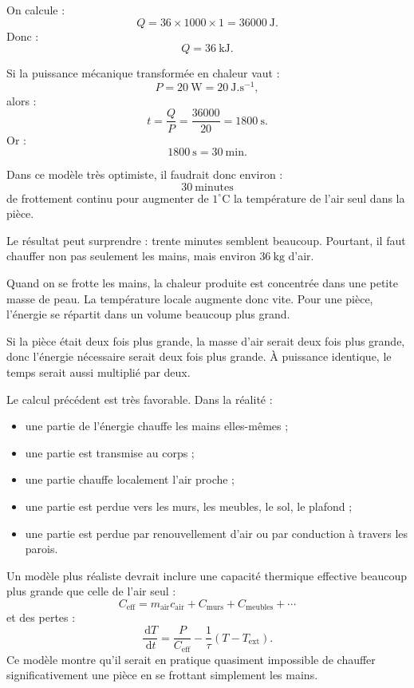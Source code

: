 \documentclass[11pt,a4paper]{article}
\newcommand{\dd}{\,\mathrm d}
\begin{document}
\begin{corrigebox}
On calcule :
\[
Q=36\times1000\times1=36000\ \mathrm J.
\]
Donc :
\[
Q=36\ \mathrm{kJ}.
\]

Si la puissance mécanique transformée en chaleur vaut :
\[
P=20\ \mathrm W=20\ \mathrm{J.s^{-1}},
\]
alors :
\[
t=\frac{Q}{P}
=
\frac{36000}{20}
=
1800\ \mathrm s.
\]
Or :
\[
1800\ \mathrm s = 30\ \mathrm{min}.
\]

Dans ce modèle très optimiste, il faudrait donc environ :
\[
\boxed{30\ \mathrm{minutes}}
\]
de frottement continu pour augmenter de \(1^\circ\mathrm C\) la température de l'air seul dans la pièce.
\end{corrigebox}

\begin{corrigebox}
Le résultat peut surprendre : trente minutes semblent beaucoup. Pourtant, il faut chauffer non pas seulement les mains, mais environ \(36\ \mathrm{kg}\) d'air. 

Quand on se frotte les mains, la chaleur produite est concentrée dans une petite masse de peau. La température locale augmente donc vite. Pour une pièce, l'énergie se répartit dans un volume beaucoup plus grand.

Si la pièce était deux fois plus grande, la masse d'air serait deux fois plus grande, donc l'énergie nécessaire serait deux fois plus grande. À puissance identique, le temps serait aussi multiplié par deux.
\end{corrigebox}

\begin{corrigebox}
Le calcul précédent est très favorable. Dans la réalité :
\begin{itemize}
  \item une partie de l'énergie chauffe les mains elles-mêmes ;
  \item une partie est transmise au corps ;
  \item une partie chauffe localement l'air proche ;
  \item une partie est perdue vers les murs, les meubles, le sol, le plafond ;
  \item une partie est perdue par renouvellement d'air ou par conduction à travers les parois.
\end{itemize}

Un modèle plus réaliste devrait inclure une capacité thermique effective beaucoup plus grande que celle de l'air seul :
\[
C_{\mathrm{eff}}=m_{\mathrm{air}}c_{\mathrm{air}}+C_{\mathrm{murs}}+C_{\mathrm{meubles}}+\cdots
\]
et des pertes :
\[
\frac{\dd T}{\dd t}
=
\frac{P}{C_{\mathrm{eff}}}
-
\frac{1}{\tau}(T-T_{\mathrm{ext}}).
\]
Ce modèle montre qu'il serait en pratique quasiment impossible de chauffer significativement une pièce en se frottant simplement les mains.
\end{corrigebox}
\end{document}
